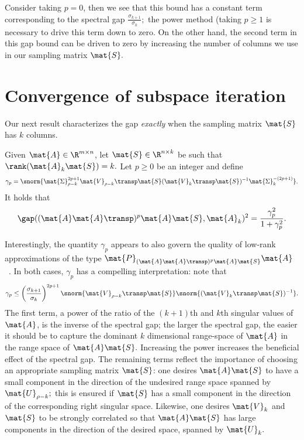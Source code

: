 \begin{remark}
Consider taking $p = 0$, then we see that this bound has a constant term
corresponding to the spectral gap $\frac{\sigma_{k+1}}{\sigma_k};$ the power
method (taking $p \geq 1$ is necessary to drive this term down to zero. On the
other hand, the second term in this gap bound can be driven to zero by
increasing the number of columns we use in our sampling matrix $\mat{S}.$
\end{remark}

\section{Convergence of subspace iteration}

Our next result characterizes the gap \emph{exactly} when the sampling matrix
$\mat{S}$ has $k$ columns.
\begin{thm}
Given $\mat{A} \in \R^{m \times n}$, let $\mat{S} \in \R^{n \times k}$ be such
that $\rank(\mat{A}_k \mat{S}) = k.$ Let $p \geq 0$ be an integer and define
\[
\gamma_p = \snorm{\mat{\Sigma}_{\rho-k}^{2p+1} \mat{V}_{\rho - k}\transp \mat{S}
(\mat{V}_k\transp \mat{S})^{-1} \mat{\Sigma}_k^{-(2p+1)}}.
\]
It holds that 
\[
\gap((\mat{A}\mat{A}\transp)^p\mat{A} \mat{S}, \mat{A}_k)^2 =
\frac{\gamma_p^2}{1 + \gamma_p^2}.
\]
\label{ch5:thm:maingapbound}
\end{thm}

\begin{remark}
Interestingly, the quantity $\gamma_p$ appears to also govern the quality of
low-rank approximations of the type
$\mat{P}_{(\mat{A}\mat{A}\transp)^p\mat{A}\mat{S}} \mat{A}$~\cite{HMT11,BDM11a}.
In both cases, $\gamma_p$ has a compelling interpretation: note that
\[
\gamma_p \leq \left(\frac{\sigma_{k+1}}{\sigma_k}\right)^{2p+1}
\snorm{\mat{V}_{\rho - k}\transp \mat{S}} \snorm{(\mat{V}_k\transp
\mat{S})^{-1}}.
\]
The first term, a power of the ratio of the $(k+1)$th and $k$th singular values
of $\mat{A}$, is the inverse of the spectral gap; the larger the spectral gap,
the easier it should be to capture the dominant $k$ dimensional range-space of
$\mat{A}$ in the range space of $\mat{A}\mat{S}.$ Increasing the power increases
the beneficial effect of the spectral gap. The remaining terms reflect the
importance of choosing an appropriate sampling matrix $\mat{S}$: one desires
$\mat{A}\mat{S}$ to have a small component in the direction of the undesired 
range space spanned by $\mat{U}_{\rho -k};$ this is ensured if $\mat{S}$ has a
small component in the direction of the corresponding right singular space.
Likewise, one desires $\mat{V}_k$ and $\mat{S}$ to be strongly correlated so
that $\mat{A}\mat{S}$ has large components in the direction of the desired
space, spanned by $\mat{U}_k.$
\end{remark}

